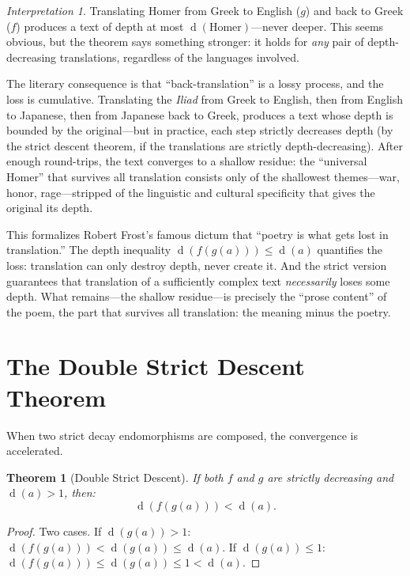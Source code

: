 \documentclass[11pt,openany]{book}
\theoremstyle{definition}
\theoremstyle{plain}
\newtheorem{theorem}[axiom]{Theorem}
\theoremstyle{remark}
\newtheorem{interpretation}[axiom]{Interpretation}
\newcommand{\depth}{\operatorname{d}}       %
\begin{document}
\begin{interpretation}
Translating Homer from Greek to English ($g$) and back to Greek ($f$) produces a text of depth at most $\depth(\text{Homer})$---never deeper. This seems obvious, but the theorem says something stronger: it holds for \emph{any} pair of depth-decreasing translations, regardless of the languages involved.

The literary consequence is that ``back-translation'' is a lossy process, and the loss is cumulative. Translating the \textit{Iliad} from Greek to English, then from English to Japanese, then from Japanese back to Greek, produces a text whose depth is bounded by the original---but in practice, each step strictly decreases depth (by the strict descent theorem, if the translations are strictly depth-decreasing). After enough round-trips, the text converges to a shallow residue: the ``universal Homer'' that survives all translation consists only of the shallowest themes---war, honor, rage---stripped of the linguistic and cultural specificity that gives the original its depth.

This formalizes Robert Frost's famous dictum that ``poetry is what gets lost in translation.'' The depth inequality $\depth(f(g(a))) \leq \depth(a)$ quantifies the loss: translation can only destroy depth, never create it. And the strict version guarantees that translation of a sufficiently complex text \emph{necessarily} loses some depth. What remains---the shallow residue---is precisely the ``prose content'' of the poem, the part that survives all translation: the meaning minus the poetry.
\end{interpretation}

\section{The Double Strict Descent Theorem}

When two strict decay endomorphisms are composed, the convergence is accelerated.

\begin{theorem}[Double Strict Descent]
If both $f$ and $g$ are strictly decreasing and $\depth(a) > 1$, then:
\[
\depth(f(g(a))) < \depth(a).
\]
\end{theorem}

\begin{proof}
Two cases. If $\depth(g(a)) > 1$: $\depth(f(g(a))) < \depth(g(a)) \leq \depth(a)$. If $\depth(g(a)) \leq 1$: $\depth(f(g(a))) \leq \depth(g(a)) \leq 1 < \depth(a)$.
\end{proof}
\end{document}
